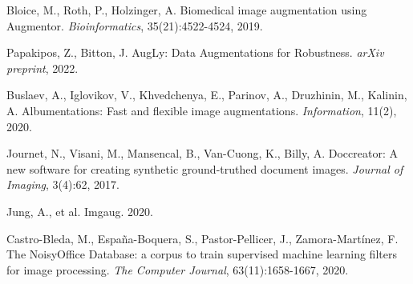 \documentclass[runningheads]{llncs}
\begin{document}
%
%
%
% 
% 
%
\begin{thebibliography}{8}
Bloice, M., Roth, P., Holzinger, A. Biomedical image augmentation using Augmentor. \emph{Bioinformatics}, 35(21):4522-4524, 2019.

Papakipos, Z., Bitton, J. AugLy: Data Augmentations for Robustness. \emph{arXiv preprint}, 2022.

Buslaev, A., Iglovikov, V., Khvedchenya, E., Parinov, A., Druzhinin, M., Kalinin, A. Albumentations: Fast and flexible image augmentations. \emph{Information}, 11(2), 2020.

Journet, N., Visani, M., Mansencal, B., Van-Cuong, K., Billy, A. Doccreator: A new software for creating synthetic ground-truthed document images. \emph{Journal of Imaging}, 3(4):62, 2017.

Jung, A., et al. Imgaug. 2020.

Castro-Bleda, M., Espa\~{n}a-Boquera, S., Pastor-Pellicer, J., Zamora-Mart\'{i}nez, F. The NoisyOffice Database: a corpus to train supervised machine learning filters for image processing. \emph{The Computer Journal}, 63(11):1658-1667, 2020.






\end{thebibliography}
\end{document}

